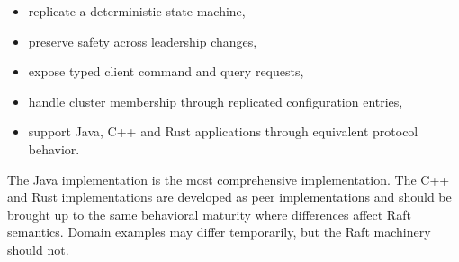 \begin{itemize}
\item replicate a deterministic state machine,
\item preserve safety across leadership changes,
\item expose typed client command and query requests,
\item handle cluster membership through replicated configuration entries,
\item support Java, C++ and Rust applications through equivalent protocol behavior.
\end{itemize}

The Java implementation is the most comprehensive implementation. The C++ and
Rust implementations are developed as peer implementations and should be brought
up to the same behavioral maturity where differences affect Raft semantics.
Domain examples may differ temporarily, but the Raft machinery should not.
